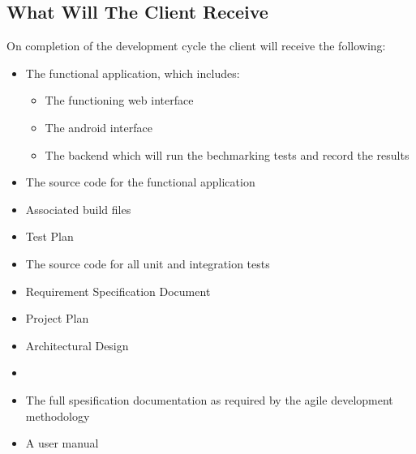 \subsection{What Will The Client Receive}
On completion of the development cycle the client will receive the following:
\begin{itemize}
	\item The functional application, which includes:
	\begin{itemize}
		\item The functioning web interface
		\item The android interface
		\item The backend which will run the bechmarking tests and record the results
	\end{itemize}
	\item The source code for the functional application
	\item Associated build files
	\item Test Plan
	\item The source code for all unit and integration tests
	\item Requirement Specification Document
	\item Project Plan
	\item Architectural Design
	\item 
	\item The full spesification documentation as required by the agile development methodology
	\item A user manual
\end{itemize}
